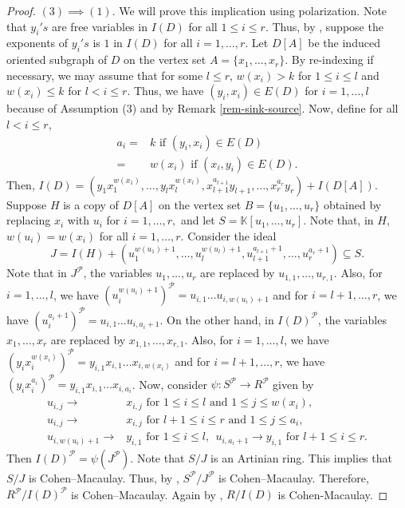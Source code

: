 \documentclass[11pt,reqno]{amsart}
\newcommand{\PP}{\mathcal{P}}
\theoremstyle{definition}
\begin{document}
\begin{proof}
	$(3)\implies (1)$. We will prove this implication using polarization. Note that $y_i's$ are free variables in $I(D)$ for all $1 \leq i \leq r$. Thus, by \cite[Lemma 2.8]{H.T-2018}, suppose the exponents of $y_i's$ is $1$ in $I(D)$ for all $i = 1, \ldots, r$. Let $D[A]$ be the induced oriented subgraph of $D$ on the vertex set $A = \{x_1, \ldots, x_r\}$. By re-indexing if necessary, we may assume that for some $l \leq r$, $w(x_i) > k$ for $1 \leq i \leq l$ and $w(x_i) \leq k$ for $l < i \leq r$. Thus, we have $(y_i, x_i) \in E(D)$ for $i = 1, \ldots, l$ because of Assumption (3) and by Remark \ref{rem-sink-source}. Now, define for all $l < i \leq r$,
	\begin{align*}
		a_i= & k \text{   if  } (y_i,x_i) \in E(D)  \\
		= &w(x_i) \text{  if  } (x_i,y_i) \in E(D).
	\end{align*}
	Then,
	$ I(D) = (y_1x^{w(x_1)}_1, \ldots, y_lx^{w(x_l)}_l, x_{l+1}^{a_{l+1}}y_{l+1}, \ldots, x_r^{a_r}y_r) + I(D[A]).$ Suppose $H$ is a copy of $D[A]$ on the vertex set $B = \{u_1, \ldots, u_r\}$ obtained by replacing $x_i$ with $u_i$ for $i = 1, \ldots, r,$ and let $S = \mathbb{K}[u_1, \ldots, u_r]$. Note that, in $H$, $w(u_i)=w(x_i)$ for all $i=1, \ldots, r$.  Consider the ideal 
	$$J = I(H) + (u_1^{w(u_1)+1}, \ldots, u_l^{w(u_l)+1},u_{l+1}^{a_{l+1}+1},\ldots,u_{r}^{a_r+1}) \subseteq S.$$ Note that in $J^{\PP}$, the variables $u_1, \ldots, u_r$ are replaced by $u_{1,1}, \ldots, u_{r,1}$. Also, for $i = 1, \ldots, l$, we have $(u_i^{w(u_i)+1})^{\PP} = u_{i,1} \ldots u_{i,w(u_i)+1}$ and for $i = l+1, \ldots, r$, we have $(u_i^{a_i+1})^{\PP} = u_{i,1} \ldots u_{i,a_i+1}$. On the other hand, in $I(D)^{\PP}$, the variables $x_1, \ldots, x_r$ are replaced by $x_{1,1}, \ldots, x_{r,1}$. Also, for $i = 1, \ldots, l$, we have
	$(y_ix_i^{w(x_i)})^{\PP} = y_{i,1}x_{i,1} \ldots x_{i,w(x_i)}$ and for $i = l+1, \ldots, r$, we have $(y_ix_i^{a_i})^{\PP} = y_{i,1}x_{i,1} \ldots x_{i,a_i}$. Now, consider $\psi : S^{\PP}\rightarrow R^{\PP}$ given by 
	\begin{align*}
		u_{i,j} \rightarrow & x_{i,j} \text{ for } 1 \leq i \leq l \text{ and } 1 \leq j \leq w(x_i), \\
		u_{i,j} \rightarrow & x_{i,j} \text{ for } l+1 \leq i \leq r \text{ and } 1 \leq j \leq a_i, \\
		u_{i, w(u_i)+1} \rightarrow & y_{i,1} \text{ for } 1 \leq i \leq l,~~ u_{i, a_i+1} \rightarrow  y_{i,1} \text{ for } l+1 \leq i \leq r.
	\end{align*}
	Then $I(D)^{\PP} = \psi(J^{\PP})$. Note that $S/J$ is an Artinian ring. This implies that $S/J$ is Cohen–Macaulay. Thus, by \cite[Proposition 2.8]{f}, $S^{\PP}/J^{\PP}$ is Cohen–Macaulay. Therefore, $R^{\PP}/I(D)^{\PP}$ is Cohen–Macaulay. Again by \cite[Proposition 2.8]{f}, $R/I(D)$ is Cohen-Macaulay.
\end{proof}
\end{document}
